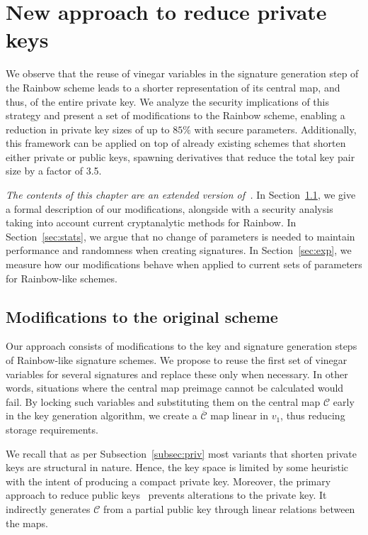 \documentclass[12pt, a4paper, oneside]{memoir}
\theoremstyle{definition}
\begin{document}
\chapter{New approach to reduce private keys}\label{ch:eta}

We observe that the reuse of vinegar variables in the signature generation step of the Rainbow scheme leads to a shorter representation of its central map, and thus, of the entire private key. We analyze the security implications of this strategy and present a set of modifications to the Rainbow scheme, enabling a reduction in private key sizes of up to $85\%$ with secure parameters. Additionally, this framework can be applied on top of already existing schemes that shorten either private or public keys, spawning derivatives that reduce the total key pair size by a factor of 3.5. 

\emph{The contents of this chapter are an extended version of~\cite{Zambonin:201907}.} In Section~\ref{sec:mod}, we give a formal description of our modifications, alongside with a security analysis taking into account current cryptanalytic methods for Rainbow. In Section~\ref{sec:stats}, we argue that no change of parameters is needed to maintain performance and randomness when creating signatures. In Section~\ref{sec:exp}, we measure how our modifications behave when applied to current sets of parameters for Rainbow-like schemes.

\section{Modifications to the original scheme}\label{sec:mod}

Our approach consists of modifications to the key and signature generation steps of Rainbow-like signature schemes. We propose to reuse the first set of vinegar variables for several signatures and replace these only when necessary. In other words, situations where the central map preimage cannot be calculated would fail. By locking such variables and substituting them on the central map $\mathcal{C}$ early in the key generation algorithm, we create a $\overline{\mathcal{C}}$ map linear in $v_{1}$, thus reducing storage requirements. 

We recall that as per Subsection~\ref{subsec:priv} most variants that shorten private keys are structural in nature. Hence, the key space is limited by some heuristic with the intent of producing a compact private key. Moreover, the primary approach to reduce public keys~\cite{Petzoldt:201307} prevents alterations to the private key. It indirectly generates $\mathcal{C}$ from a partial public key through linear relations between the maps. 
\end{document}
